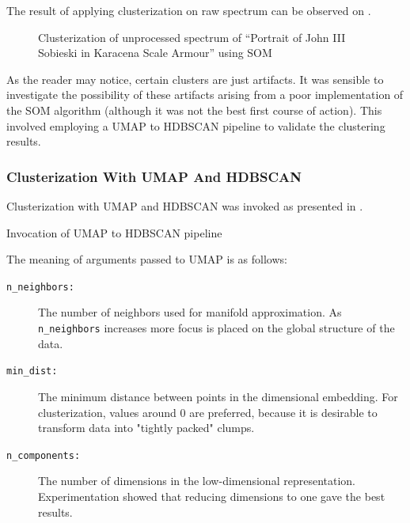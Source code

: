 The result of applying clusterization on raw spectrum can be observed on .

\newpage
\begin{figure}[H] 
  \centering     
   
  \caption{Clusterization of unprocessed spectrum of ``Portrait of John III Sobieski in Karacena Scale Armour'' using SOM}
  \label{fig:sobieski_clustered_som_noise}
\end{figure}

As the reader may notice, certain clusters are just artifacts. 
It was sensible to investigate the possibility of these artifacts arising from a poor implementation of the SOM algorithm (although it was not the best first course of action). 
This involved employing a UMAP to HDBSCAN pipeline to validate the clustering results.

\subsubsection{Clusterization With UMAP And HDBSCAN}
Clusterization with UMAP and HDBSCAN was invoked as presented in .

\newenvironment{longlistingH}{\captionsetup{type=listing, width=0.8\textwidth}}{}
\begin{longlistingH}
    \caption{Invocation of UMAP to HDBSCAN pipeline}
    \label{lst:umap-hdbscan-invocation}
\end{longlistingH}
\vspace{12pt}

The meaning of arguments passed to UMAP is as follows:
\begin{description}
    \item[\texttt{n\_neighbors:}] The number of neighbors used for manifold approximation. As \texttt{n\_neighbors} increases more focus is placed on the global structure of the data. 
    \item[\texttt{min\_dist:}] The minimum distance between points in the dimensional embedding. For clusterization, values around 0 are preferred, because it is desirable to transform data into "tightly packed" clumps.
    \item[\texttt{n\_components:}] The number of dimensions in the low-dimensional representation. Experimentation showed that reducing dimensions to one gave the best results. 
\end{description}

